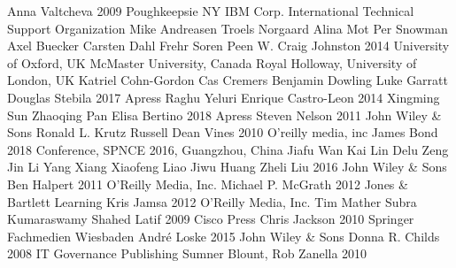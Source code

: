 \documentclass{article}
\begin{document}
\begin{thebibliography}{9}
        Anna Valtcheva
        2009
        Poughkeepsie NY IBM Corp. International Technical Support Organization
        Mike Andreasen
        Troels Norgaard
        Alina Mot
        Per Snowman
        Axel Buecker
        Carsten Dahl Frehr
        Soren Peen
        W. Craig Johnston
        2014
        University of Oxford, UK
        McMaster University, Canada
        Royal Holloway, University of London, UK
        Katriel Cohn-Gordon
        Cas Cremers
        Benjamin Dowling
        Luke Garratt
        Douglas Stebila
        2017
        Apress
        Raghu Yeluri
        Enrique Castro-Leon
        2014
        Xingming Sun
        Zhaoqing Pan
        Elisa Bertino
        2018
        Apress
        Steven Nelson
        2011
        John Wiley \& Sons
        Ronald L. Krutz
        Russell Dean Vines
        2010
        O'reilly media, inc
        James Bond
        2018
        Conference, SPNCE 2016, Guangzhou, China
        Jiafu Wan
        Kai Lin
        Delu Zeng
        Jin Li
        Yang Xiang
        Xiaofeng Liao
        Jiwu Huang
        Zheli Liu
        2016
        John Wiley \& Sons
        Ben Halpert
        2011
        O'Reilly Media, Inc.
        Michael P. McGrath
        2012
        Jones \& Bartlett Learning
        Kris Jamsa
        2012
        O'Reilly Media, Inc.
        Tim Mather
        Subra Kumaraswamy
        Shahed Latif
        2009
        Cisco Press
        Chris Jackson
        2010
        Springer Fachmedien Wiesbaden
        André Loske
        2015
        John Wiley \& Sons
        Donna R. Childs
        2008
        IT Governance Publishing
        Sumner Blount, Rob Zanella
        2010

\end{thebibliography}
\end{document}
